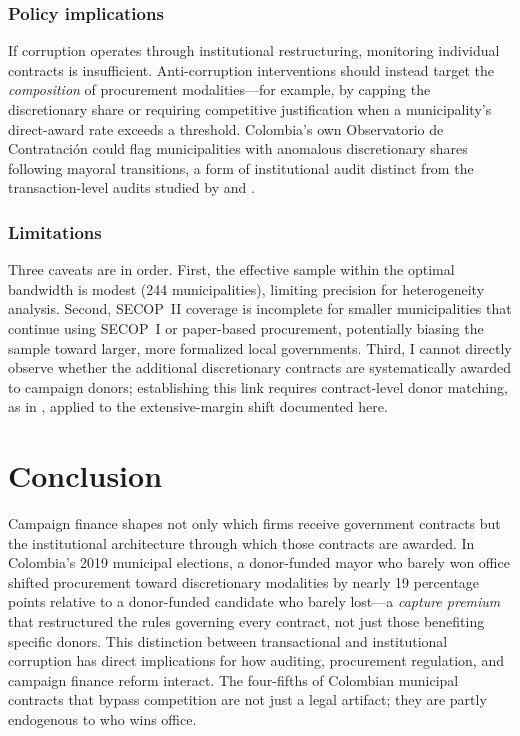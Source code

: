 \documentclass[12pt]{article}
\begin{document}
\subsubsection*{Policy implications} If corruption operates through institutional restructuring, monitoring individual contracts is insufficient. Anti-corruption interventions should instead target the \textit{composition} of procurement modalities---for example, by capping the discretionary share or requiring competitive justification when a municipality's direct-award rate exceeds a threshold. Colombia's own Observatorio de Contrataci\'{o}n could flag municipalities with anomalous discretionary shares following mayoral transitions, a form of institutional audit distinct from the transaction-level audits studied by \citet{ferraz2011electoral} and \citet{olken2007monitoring}.

\subsubsection*{Limitations} Three caveats are in order. First, the effective sample within the optimal bandwidth is modest (244 municipalities), limiting precision for heterogeneity analysis. Second, SECOP~II coverage is incomplete for smaller municipalities that continue using SECOP~I or paper-based procurement, potentially biasing the sample toward larger, more formalized local governments. Third, I cannot directly observe whether the additional discretionary contracts are systematically awarded to campaign donors; establishing this link requires contract-level donor matching, as in \citet{gulzar2022procurement}, applied to the extensive-margin shift documented here.

\section{Conclusion}

Campaign finance shapes not only which firms receive government contracts but the institutional architecture through which those contracts are awarded. In Colombia's 2019 municipal elections, a donor-funded mayor who barely won office shifted procurement toward discretionary modalities by nearly 19 percentage points relative to a donor-funded candidate who barely lost---a \textit{capture premium} that restructured the rules governing every contract, not just those benefiting specific donors. This distinction between transactional and institutional corruption has direct implications for how auditing, procurement regulation, and campaign finance reform interact. The four-fifths of Colombian municipal contracts that bypass competition are not just a legal artifact; they are partly endogenous to who wins office.
\end{document}
